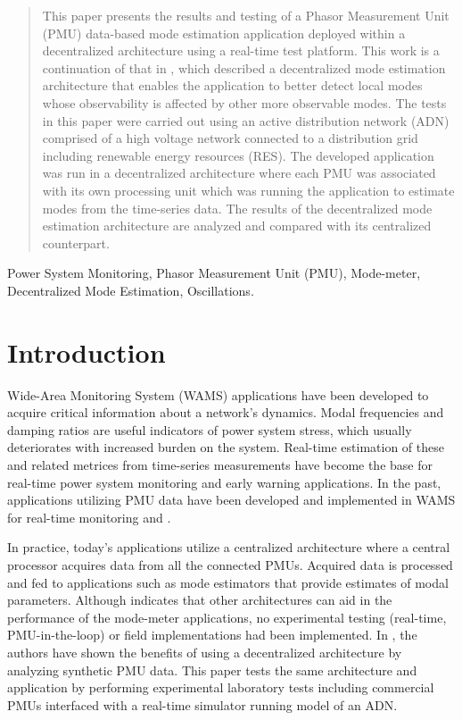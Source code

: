 \documentclass[conference]{IEEEtran}
\begin{document}
\begin{abstract}
This paper presents the results and testing of a Phasor Measurement Unit (PMU) data-based mode estimation application deployed within a decentralized architecture using a real-time test platform. This work is a  continuation of that in \cite{gm2016}, which described a decentralized mode estimation architecture that enables the application to better detect local modes whose observability is affected by other more observable modes. The tests in this paper were carried out using an active distribution network (ADN) comprised of a high voltage network connected to a distribution grid including renewable energy resources (RES). The developed application was run in a decentralized architecture where each PMU was associated with its own processing unit which was running the application to estimate modes from the time-series data. The results of the decentralized mode estimation architecture are analyzed and compared with its centralized counterpart.\\
\end{abstract}

\begin{IEEEkeywords}
Power System Monitoring, Phasor Measurement Unit (PMU), Mode-meter, Decentralized Mode Estimation, Oscillations.
\end{IEEEkeywords}


\section{Introduction}

Wide-Area Monitoring System (WAMS) applications have been developed to acquire critical information about a network's dynamics. Modal frequencies and damping ratios are useful indicators of power system stress, which usually deteriorates with increased burden on the system. Real-time estimation of these and related metrices from time-series measurements have become the base for real-time power system  monitoring and early warning applications. In the past, applications utilizing PMU data have been developed and implemented in WAMS for real-time monitoring \cite{hauer1,mani2} and \cite{taskforce}. 

In practice, today's applications utilize a centralized architecture where a central processor acquires data from all the connected PMUs. Acquired data is processed and fed to applications such as mode estimators that provide estimates of modal parameters. Although \cite{mani2} indicates that other architectures can aid in the performance of the mode-meter applications, no experimental testing (real-time, PMU-in-the-loop) or field implementations had been implemented. In \cite{gm2016}, the authors have shown the benefits of using a decentralized architecture by analyzing synthetic PMU data. This paper tests the same architecture and application by performing experimental laboratory tests including commercial PMUs interfaced with a real-time simulator running model of an ADN.
\end{document}
